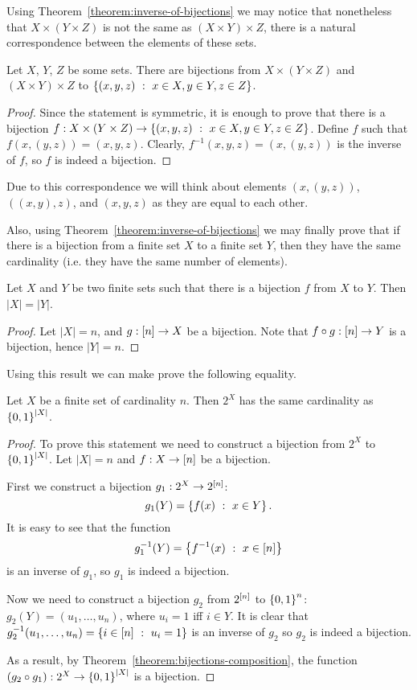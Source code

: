 Using Theorem~\ref{theorem:inverse-of-bijections} we may notice that
nonetheless that $X \times (Y \times Z)$ is not the same as
$(X \times Y) \times Z$, there is a natural correspondence between the elements
of these sets.
\begin{theorem}
    Let $X$, $Y$, $Z$ be some sets.
    There are bijections from $X \times (Y \times Z)$ and
    $(X \times Y) \times Z$ to $\set[x \in X, y \in Y, z \in Z]{(x, y, z)}$.
\end{theorem}
\begin{proof}
    Since the statement is symmetric, it is enough to prove that there is
    a bijection $f : X \times (Y \times Z) \to
    \set[x \in X, y \in Y, z \in Z]{(x, y, z)}$. Define $f$ such that
    $f(x, (y, z)) = (x, y, z)$.
    Clearly, $f^{-1}(x, y, z) = (x, (y, z))$ is the inverse of $f$, so $f$ is
    indeed a bijection.
\end{proof}
Due to this correspondence we will think about elements $(x, (y, z))$,
$((x, y), z)$, and $(x, y, z)$ as they are equal to each other.

Also, using Theorem~\ref{theorem:inverse-of-bijections} we may finally prove
that if there is a bijection from a finite set $X$ to a finite set $Y$, then
they have the same cardinality (i.e. they have the same number of elements).
\begin{theorem}
    Let $X$ and $Y$ be two finite sets such that there is a bijection $f$ from
    $X$ to $Y$. Then $|X| = |Y|$.
\end{theorem}
\begin{proof}
    Let $|X| = n$, and $g : {[{n}]} \to X$ be a bijection.
    Note that $f \circ g : {[{n}]} \to Y$ is a bijection, hence $|Y| = n$.
\end{proof}

Using this result we can make prove the following equality.
\begin{corollary}
\label{corollary:power-set-and-set-of-binary-strings}
    Let $X$ be a finite set of cardinality $n$. Then $2^X$ has the same
    cardinality as $\set{0, 1}^{|X|}$.
\end{corollary}
\begin{proof}
    To prove this statement we need to construct a bijection from $2^X$ to
    $\set{0, 1}^{|X|}$. Let $|X| = n$ and $f : X \to {[{n}]}$ be a bijection.

    First we construct a bijection $g_1 : 2^X \to 2^{{[{n}]}}$:
    \[
        g_1(Y) = \set[x \in Y]{f(x)}.
    \]
    It is easy to see that the function
    \[
        g^{-1}_1(Y) = \set[{x \in \range{n}}]{f^{-1}(x)}
    \]
    is an inverse of $g_1$, so $g_1$ is indeed a bijection.

    Now we need to construct a bijection $g_2$ from $2^{{[{n}]}}$ to
    $\set{0, 1}^n$:
    $g_2(Y) = (u_1, \dots, u_n)$, where $u_i = 1$ iff $i \in Y$. It is clear
    that $g^{-1}_2(u_1, \dots, u_n) = \set[u_i = 1]{i \in \range{n}}$ is an
    inverse of $g_2$ so $g_2$ is indeed a bijection.

    As a result, by Theorem~\ref{theorem:bijections-composition}, the function
    $(g_2 \circ g_1) : 2^X \to \set{0, 1}^{|X|}$ is a bijection.
\end{proof}

